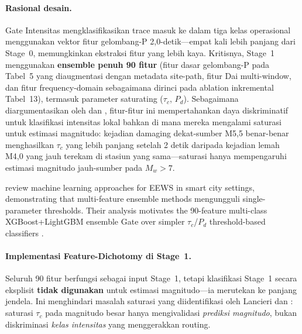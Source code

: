 \documentclass[10pt]{article}
\renewcommand{\cite}[1]{\citep{#1}}
\begin{document}
\paragraph{Rasional desain.} Gate Intensitas mengklasifikasikan trace masuk ke dalam tiga kelas operasional menggunakan vektor fitur gelombang-P 2,0-detik---empat kali lebih panjang dari Stage~0, memungkinkan ekstraksi fitur yang lebih kaya. Kritisnya, Stage~1 menggunakan \textbf{ensemble penuh 90 fitur} (fitur dasar gelombang-P pada Tabel~5 yang diaugmentasi dengan metadata site-path, fitur Dai multi-window, dan fitur frequency-domain sebagaimana dirinci pada ablation inkremental Tabel~13), termasuk parameter saturating (\(\tau_c\), \(P_d\)). Sebagaimana diargumentasikan oleh \citet{ref22} dan \citet{ref17}, fitur-fitur ini mempertahankan daya diskriminatif untuk klasifikasi intensitas lokal bahkan di mana mereka mengalami saturasi untuk estimasi magnitudo: kejadian damaging dekat-sumber M5,5 benar-benar menghasilkan \(\tau_c\) yang lebih panjang setelah 2 detik daripada kejadian lemah M4,0 yang jauh terekam di stasiun yang sama---saturasi hanya mempengaruhi estimasi magnitudo jauh-sumber pada \(M_w > 7\).

\citet{ref59} review machine learning approaches for EEWS in smart city settings, demonstrating that multi-feature ensemble methods mengungguli single-parameter thresholds. Their analysis motivates the 90-feature multi-class XGBoost+LightGBM ensemble Gate over simpler \(\tau_c\)/\(P_d\) threshold-based classifiers \cite{ref22}.

\paragraph{Implementasi Feature-Dichotomy di Stage~1.} Seluruh 90 fitur berfungsi sebagai input Stage~1, tetapi klasifikasi Stage~1 secara eksplisit \textbf{tidak digunakan} untuk estimasi magnitudo---ia merutekan ke panjang jendela. Ini menghindari masalah saturasi yang diidentifikasi oleh Lancieri dan \citet{ref24}: saturasi \(\tau_c\) pada magnitudo besar hanya mengivalidasi \emph{prediksi magnitudo}, bukan diskriminasi \emph{kelas intensitas} yang menggerakkan routing.
\end{document}

